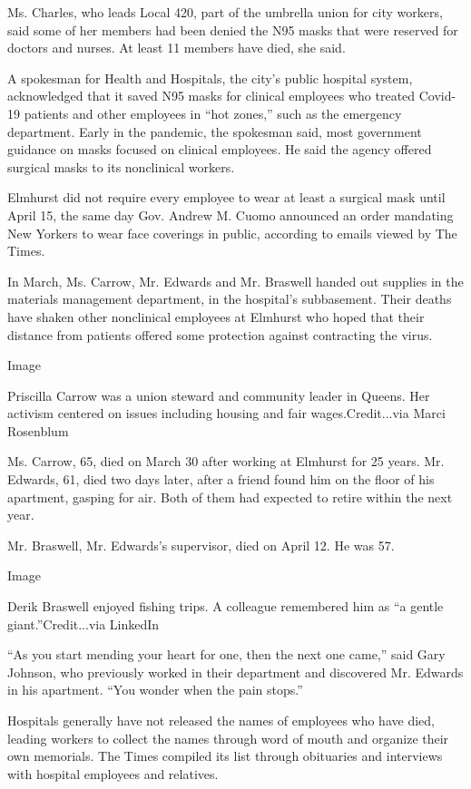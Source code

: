 Ms. Charles, who leads Local 420, part of the umbrella union for city
workers, said some of her members had been denied the N95 masks that
were reserved for doctors and nurses. At least 11 members have died, she
said.

A spokesman for Health and Hospitals, the city's public hospital system,
acknowledged that it saved N95 masks for clinical employees who treated
Covid-19 patients and other employees in ``hot zones,'' such as the
emergency department. Early in the pandemic, the spokesman said, most
government guidance on masks focused on clinical employees. He said the
agency offered surgical masks to its nonclinical workers.

Elmhurst did not require every employee to wear at least a surgical mask
until April 15, the same day Gov. Andrew M. Cuomo announced an order
mandating New Yorkers to wear face coverings in public, according to
emails viewed by The Times.

In March, Ms. Carrow, Mr. Edwards and Mr. Braswell handed out supplies
in the materials management department, in the hospital's subbasement.
Their deaths have shaken other nonclinical employees at Elmhurst who
hoped that their distance from patients offered some protection against
contracting the virus.

Image

Priscilla Carrow was a union steward and community leader in Queens. Her
activism centered on issues including housing and fair
wages.Credit...via Marci Rosenblum

Ms. Carrow, 65, died on March 30 after working at Elmhurst for 25 years.
Mr. Edwards, 61, died two days later, after a friend found him on the
floor of his apartment, gasping for air. Both of them had expected to
retire within the next year.

Mr. Braswell, Mr. Edwards's supervisor, died on April 12. He was 57.

Image

Derik Braswell enjoyed fishing trips. A colleague remembered him as ``a
gentle giant.''Credit...via LinkedIn

``As you start mending your heart for one, then the next one came,''
said Gary Johnson, who previously worked in their department and
discovered Mr. Edwards in his apartment. ``You wonder when the pain
stops.''

Hospitals generally have not released the names of employees who have
died, leading workers to collect the names through word of mouth and
organize their own memorials. The Times compiled its list through
obituaries and interviews with hospital employees and relatives.

